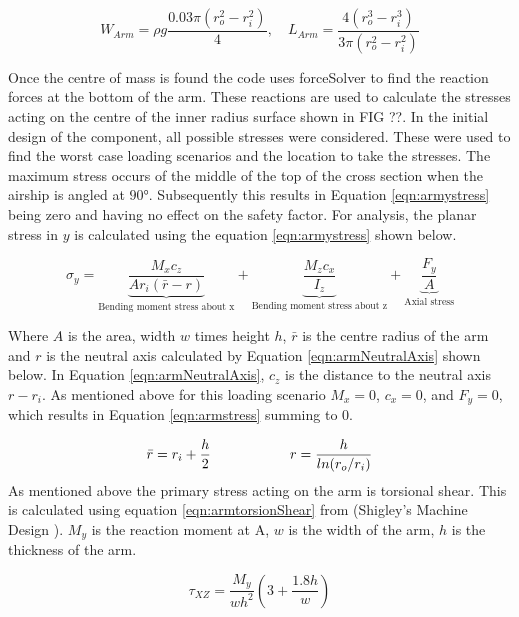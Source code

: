 \documentclass[../main.tex]{subfiles}
\begin{document}
\begin{equation} \label{eqn:armCg}
W_{Arm} = \rho g\frac{0.03\pi(r_o^2 - r_i^2)}{4}, \quad L_{Arm} =\frac{4(r_o^3 - r_i^3)}{3\pi(r_o^2 - r_i^2)}
\end{equation}

Once the centre of mass is found the code uses forceSolver to find the reaction forces at the bottom of the arm. These reactions are used to calculate the stresses acting on the centre of the inner radius surface shown in FIG ??. In the initial design of the component, all possible stresses were considered. These were used to find the worst case loading scenarios and the location to take the stresses. The maximum stress occurs of the middle of the top of the cross section when the airship is angled at $90°$. Subsequently this results in Equation \ref{eqn:armystress} being zero and having no effect on the safety factor. For analysis, the planar stress in $y$ is calculated using the equation \ref{eqn:armystress} shown below. 

\begin{equation}
\label{eqn:armstress}
\sigma_{y}=  \underbrace{\frac{M_{x}c_z}{A r_i (\bar{r} - r)}}_\text{Bending moment stress about x} + \underbrace{\frac{M_{z}c_x}{I_z}}_\text{Bending moment stress about z} + \underbrace{\frac{F_y}{A}}_\text{Axial stress} 
\end{equation}

Where $A$ is the area, width $w$ times height $h$, $\bar{r}$ is the centre radius of the arm and $r$ is the neutral axis calculated by Equation \ref{eqn:armNeutralAxis} shown below. In Equation \ref{eqn:armNeutralAxis}, $c_z$ is the distance to the neutral axis $r - r_i$. As mentioned above for this loading scenario $M_x = 0$, $c_x = 0$, and $F_y = 0$, which results in Equation \ref{eqn:armstress} summing to 0.

\begin{equation} \label{eqn:armNeutralAxis}
\bar{r} = r_i + \frac{h}{2} \hspace{20mm}  r = \frac{h}{ln(r_o/r_i)}
\end{equation}
As mentioned above the primary stress acting on the arm is torsional shear. This is calculated using equation \ref{eqn:armtorsionShear} from {(Shigley's Machine Design \cite[102]{shigley})}. $M_y$ is the reaction moment at A, $w$ is the width of the arm, $h$ is the thickness of the arm.

\begin{equation} \label{eqn:armtorsionShear}
\tau_{XZ} = \dfrac{M_{y}}{wh^2}(3+\frac{1.8h}{w})
\end{equation}
\end{document}
